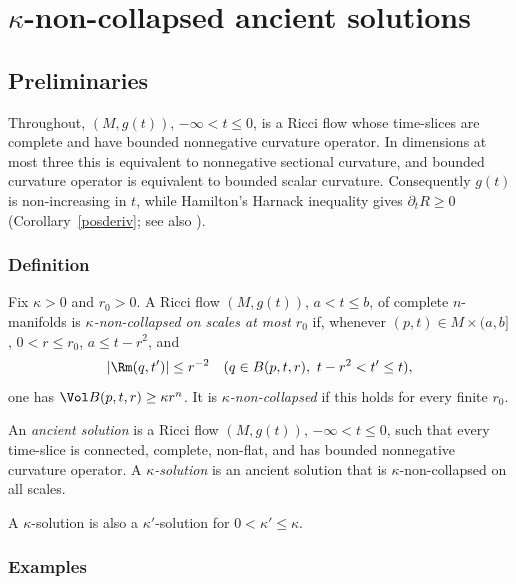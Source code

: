 \chapter{$\kappa$-non-collapsed ancient solutions}\label{chap:kappa-ancient-solutions}
\label{kappasect}

\section{Preliminaries}

Throughout, $(M,g(t))$, $-\infty<t\leq0$, is a Ricci flow whose
time-slices are complete and have bounded nonnegative curvature operator.
In dimensions at most three this is equivalent to nonnegative sectional
curvature, and bounded curvature operator is equivalent to bounded scalar
curvature. Consequently $g(t)$ is non-increasing in $t$, while Hamilton's
Harnack inequality gives $\partial_tR\geq0$ (Corollary~\ref{posderiv};
see also \cite{Hamiltonharnack}).

\subsection{Definition}

\begin{definition}\label{def:kappa-noncollapsed}
\label{kappadefn}
Fix $\kappa>0$ and $r_0>0$. A Ricci flow $(M,g(t))$, $a<t\leq b$,
of complete $n$-manifolds is \emph{$\kappa$-non-collapsed on scales at
most $r_0$} if, whenever $(p,t)\in M\times(a,b]$, $0<r\leq r_0$,
$a\leq t-r^2$, and
\[
 |\Rm(q,t')|\leq r^{-2}
 \quad(q\in B(p,t,r),\ t-r^2<t'\leq t),
\]
one has $\Vol B(p,t,r)\geq\kappa r^n$. It is
\emph{$\kappa$-non-collapsed} if this holds for every finite $r_0$.
\end{definition}

\begin{definition}\label{def:ancient-solution}
An \emph{ancient solution} is a Ricci flow $(M,g(t))$,
$-\infty<t\leq0$, such that every time-slice is connected, complete,
non-flat, and has bounded nonnegative curvature operator. A
\emph{$\kappa$-solution} is an ancient solution that is
$\kappa$-non-collapsed on all scales.
\end{definition}

A $\kappa$-solution is also a $\kappa'$-solution for
$0<\kappa'\leq\kappa$.

\subsection{Examples}

